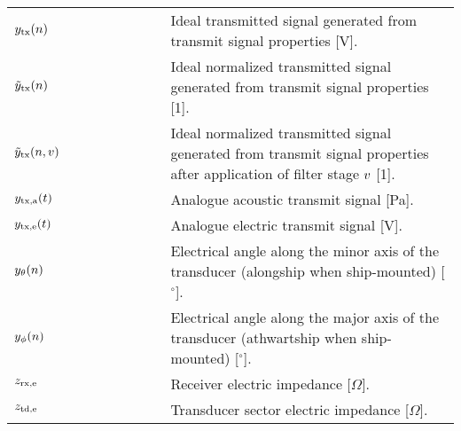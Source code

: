 \documentclass[12pt,a4paper]{article}
\begin{document}
\begin{longtable}{p{0.15\linewidth} p{0.2\linewidth} p{0.65\linewidth} }
$y_{\textrm{tx}}(n)$ & & Ideal transmitted signal generated from transmit signal properties [V].\\
$\tilde{y}_{\textrm{tx}}(n)$ & & Ideal normalized transmitted signal generated from transmit signal properties [1].\\
$\tilde{y}_{\textrm{tx}}(n,v)$ & & Ideal normalized transmitted signal generated from transmit signal properties after application of filter stage $v$ [1].\\

$y_{\textrm{tx,a}}(t)$ & & Analogue acoustic transmit signal [Pa].\\

$y_{\textrm{tx,e}}(t)$ & & Analogue electric transmit signal [V].\\

$y_\theta(n)$ & & Electrical angle along the minor axis of the transducer (alongship when ship-mounted) [$^{\circ}$].\\
$y_\phi(n)$ & & Electrical angle along the major axis of the transducer (athwartship when ship-mounted) [$^{\circ}$].\\

$z_{\textrm{rx,e}}$ & & Receiver electric impedance [$\Omega$].\\
$z_{\textrm{td,e}}$ & & Transducer sector electric impedance [$\Omega$].\\


\end{longtable}
\end{document}
